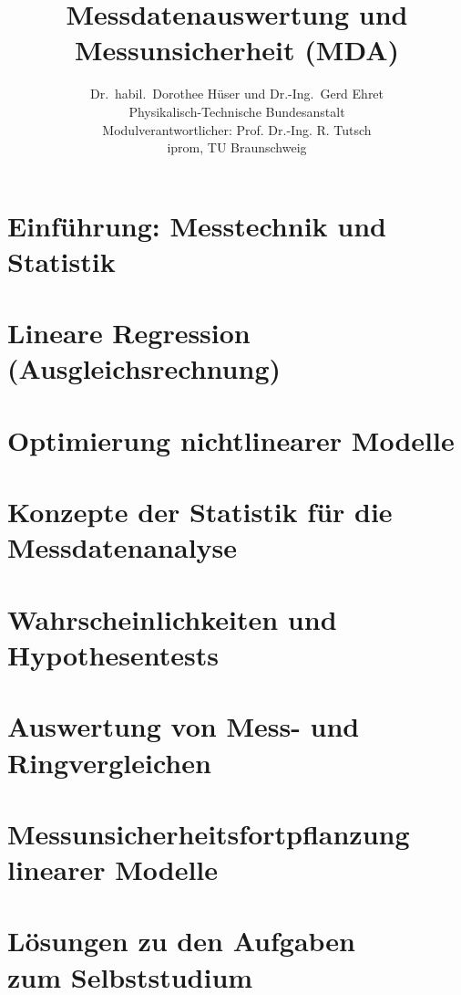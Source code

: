 \documentclass[a4paper,11pt]{book}
\title{\normalfont\sffamily\bfseries{\Huge{Messdatenauswertung und Messunsicherheit (MDA)}}}
\author{Dr.\ habil.\ Dorothee Hüser und Dr.-Ing.\ Gerd Ehret\\
Physikalisch-Technische Bundesanstalt\\
Modulverantwortlicher: Prof. Dr.-Ing. R. Tutsch\\
iprom, TU Braunschweig}
\begin{document}
\frontmatter                            %
\maketitle                              %
\tableofcontents                        %
\mainmatter                             %

\chapter{Einführung: Messtechnik und Statistik}

%
\chapter{Lineare Regression (Ausgleichsrechnung)}

%
\chapter{Optimierung nichtlinearer Modelle}

%
\chapter{Konzepte der Statistik für die Messdatenanalyse}

%
\chapter{Wahrscheinlichkeiten und Hypothesentests}

%
\chapter{Auswertung von Mess- und Ringvergleichen}
%
\chapter{Messunsicherheitsfortpflanzung\\ linearer Modelle}
%
\chapter{Lösungen zu den Aufgaben\\ zum Selbststudium}


\end{document}
